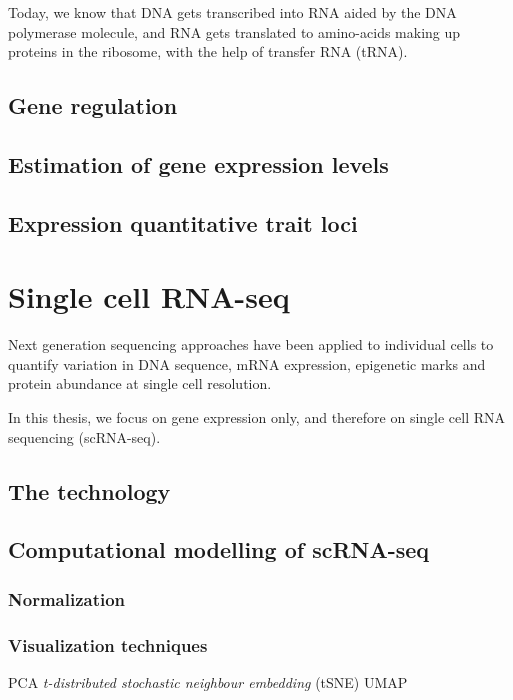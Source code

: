Today, we know that DNA gets transcribed into RNA aided by the DNA polymerase molecule, and RNA gets translated to amino-acids making up proteins in the ribosome, with the help of transfer RNA (tRNA).

\subsection{Gene regulation}
\subsection{Estimation of gene expression levels}
\subsection{Expression quantitative trait loci}

\section{Single cell RNA-seq}  %

Next generation sequencing approaches have been applied to individual cells to quantify
variation in DNA sequence, mRNA expression, epigenetic marks and protein abundance
at single cell resolution.

In this thesis, we focus on gene expression only, and therefore on single cell RNA sequencing (scRNA-seq).\\

\subsection{The technology}

\subsection{Computational modelling of scRNA-seq}
\subsubsection{Normalization}
\subsubsection{Visualization techniques}

PCA
\textit{t-distributed stochastic neighbour embedding} (tSNE)
UMAP

